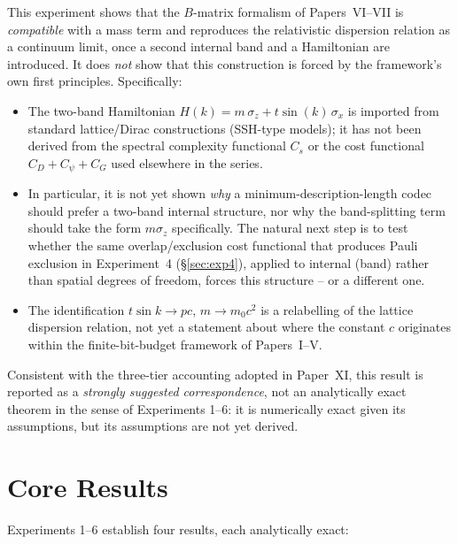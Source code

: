 \documentclass[11pt]{article}
\begin{document}
This experiment shows that the $B$-matrix formalism of Papers~VI--VII is
\emph{compatible} with a mass term and reproduces the relativistic dispersion
relation as a continuum limit, once a second internal band and a Hamiltonian
are introduced. It does \emph{not} show that this construction is forced by
the framework's own first principles. Specifically:
\begin{itemize}
  \item The two-band Hamiltonian $H(k) = m\,\sigma_z + t\sin(k)\,\sigma_x$
        is imported from standard lattice/Dirac constructions (SSH-type
        models); it has not been derived from the spectral complexity
        functional $C_s$ or the cost functional $C_D + C_\psi + C_G$ used
        elsewhere in the series.
  \item In particular, it is not yet shown \emph{why} a minimum-description-length
        codec should prefer a two-band internal structure, nor why the
        band-splitting term should take the form $m\sigma_z$ specifically.
        The natural next step is to test whether the same overlap/exclusion
        cost functional that produces Pauli exclusion in Experiment~4
        (\S\ref{sec:exp4}), applied to internal (band) rather than spatial
        degrees of freedom, forces this structure -- or a different one.
  \item The identification $t\sin k \to pc$, $m \to m_0c^2$ is a relabelling
        of the lattice dispersion relation, not yet a statement about where
        the constant $c$ originates within the finite-bit-budget framework
        of Papers~I--V.
\end{itemize}
Consistent with the three-tier accounting adopted in Paper~XI, this result is
reported as a \emph{strongly suggested correspondence}, not an analytically
exact theorem in the sense of Experiments 1--6: it is numerically exact given
its assumptions, but its assumptions are not yet derived.

\section{Core Results}
\label{sec:results}

Experiments 1--6 establish four results, each analytically exact:
\end{document}
